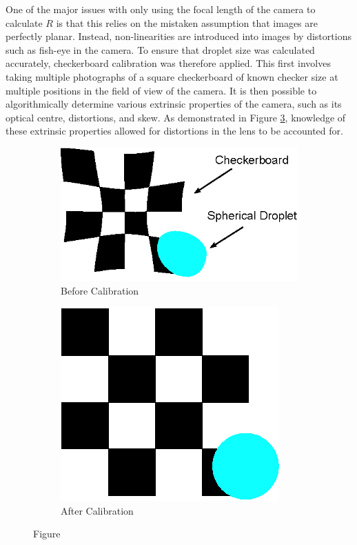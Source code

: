 \documentclass{physics_article_B}
\begin{document}
            One of the major issues with only using the focal length of the camera to calculate $R$ is that this relies on the mistaken assumption that images are perfectly planar. Instead, non-linearities are introduced into images by distortions such as fish-eye in the camera. To ensure that droplet size was calculated accurately, checkerboard calibration was therefore applied. This first involves taking multiple photographs of a square checkerboard of known checker size at multiple positions in the field of view of the camera. It is then possible to algorithmically determine various extrinsic properties of the camera, such as its optical centre, distortions, and skew\cite{CameraCalibration}. As demonstrated in Figure \ref{fig:calibsetup}, knowledge of these extrinsic properties allowed for distortions in the lens to be accounted for. 
            
                \begin{figure}[H]
                    \centering
                    \begin{subfigure}[b]{0.48\textwidth}
                        \includegraphics[width=\textwidth]{Figures/Distorted.eps}
                        \caption{Before Calibration}
                        \label{fig:calibsetup:distorted}
                    \end{subfigure}
                    \begin{subfigure}[b]{0.48\textwidth}
                        \includegraphics[scale=1.27]{Figures/Undistorted.eps}
                        \caption{After Calibration}
                        \label{fig:calibsetup:undistorted}
                    \end{subfigure}
                    \caption{Figure }\label{fig:calibsetup}
                \end{figure}
            
\end{document}
